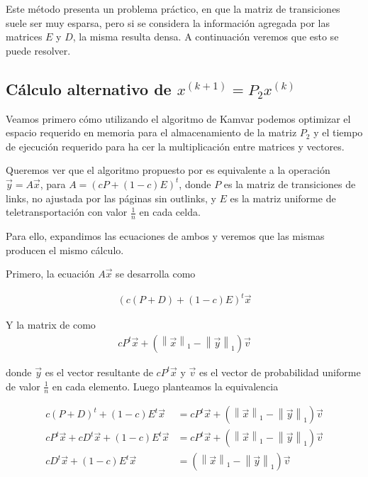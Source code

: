 Este método presenta un problema práctico, en que la matriz de transiciones suele ser muy
esparsa, pero si se considera la información agregada por las matrices $E$ y $D$, la misma
resulta densa. A continuación veremos que esto se puede resolver.

\subsection{Cálculo alternativo de $x^{(k + 1)} = P_2x^{(k)}$}

Veamos primero cómo utilizando el algoritmo de Kamvar podemos optimizar el espacio requerido
en memoria para el almacenamiento de la matriz $P_2$ y el tiempo de ejecución requerido para ha
cer la multiplicación entre matrices y vectores.

\newcommand{\vectornorm}[1]{\left\|#1\right\|}
Queremos ver que el algoritmo propuesto por \cite[Algoritmo 1]{Kamvar2003} es equivalente
a la operación $\vec{y} = A\vec{x}$, para $A=(cP + (1-c)E)^{t}$, donde $P$ es la matriz
de transiciones de links, no ajustada por las páginas sin outlinks,
y $E$ es la matriz uniforme de teletransportación con valor $\frac{1}{n}$ en cada celda.

Para ello, expandimos las ecuaciones de ambos y veremos que las mismas producen el mismo cálculo.

Primero, la ecuación $A\vec{x}$ se desarrolla como

\begin{align*}
(c(P + D) + (1 - c)E)^{t} \vec{x}
\end{align*}

Y la matrix de \cite[Algoritmo 1]{Kamvar 2003} como
\begin{align*}
cP^{t}\vec{x} + (\vectornorm{\vec{x}}_1 - \vectornorm{\vec{y}}_1)\vec{v}
\end{align*}

donde $\vec{y}$ es el vector resultante de $cP^{t}\vec{x}$ y $\vec{v}$ es el vector de probabilidad
uniforme de valor $\frac{1}{n}$ en cada elemento. Luego planteamos la equivalencia

\begin{align*}
c(P + D)^{t} + (1-c)E^{t} \vec{x} &= cP^{t}\vec{x} + (\vectornorm{\vec{x}}_1 - \vectornorm{\vec{y}}_1)\vec{v} \\
cP^{t}\vec{x} + cD^{t}\vec{x} + (1-c)E^{t}\vec{x} &= cP^{t}\vec{x} + (\vectornorm{\vec{x}}_1 - \vectornorm{\vec{y}}_1)\vec{v} \\
cD^{t}\vec{x} + (1-c)E^{t}\vec{x} &= (\vectornorm{\vec{x}}_1 - \vectornorm{\vec{y}}_1)\vec{v}
\end{align*}

